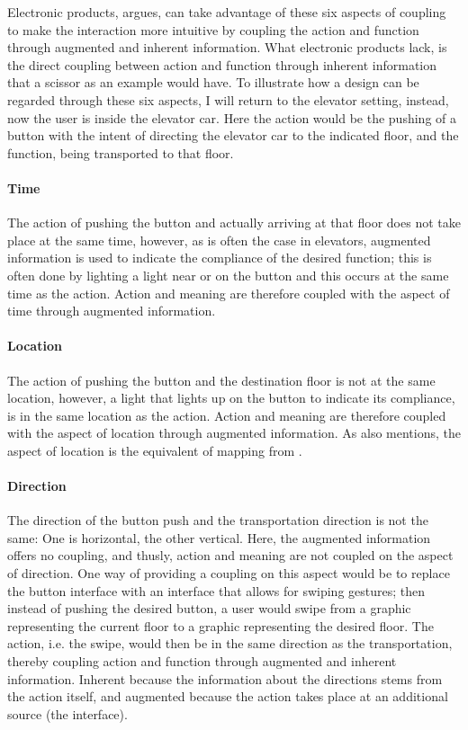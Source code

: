 Electronic products,  argues, can take advantage of these six aspects of coupling to make the interaction more intuitive by coupling the action and function through augmented and inherent information. What electronic products lack, is the direct coupling between action and function through inherent information that a scissor as an example would have. To illustrate how a design can be regarded through these six aspects, I will return to the elevator setting, instead, now the user is inside the elevator car. Here the action would be the pushing of a button with the intent of directing the elevator car to the indicated floor, and the function, being transported to that floor.
\paragraph{Time} The action of pushing the button and actually arriving at that floor does not take place at the same time, however, as is often the case in elevators, augmented information is used to indicate the compliance of the desired function; this is often done by lighting a light near or on the button and this occurs at the same time as the action. Action and meaning are therefore coupled with the aspect of time through augmented information.
\paragraph{Location} The action of pushing the button and the destination floor is not at the same location, however, a light that lights up on the button to indicate its compliance, is in the same location as the action. Action and meaning are therefore coupled with the aspect of location through augmented information. As  also mentions, the aspect of location is the equivalent of mapping from .
\paragraph{Direction} The direction of the button push and the transportation direction is not the same: One is horizontal, the other vertical. Here, the augmented information offers no coupling, and thusly, action and meaning are not coupled on the aspect of direction. One way of providing a coupling on this aspect would be to replace the button interface with an interface that allows for swiping gestures; then instead of pushing the desired button, a user would swipe from a graphic representing the current floor to a graphic representing the desired floor. The action, i.e. the swipe, would then be in the same direction as the transportation, thereby coupling action and function through augmented and inherent information. Inherent because the information about the directions stems from the action itself, and augmented because the action takes place at an additional source (the interface).
